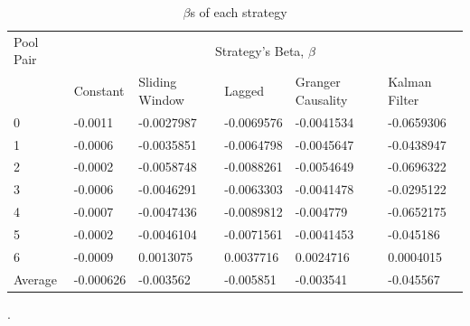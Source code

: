 \begin{table}[!htb]
    \centering
    \begin{adjustwidth}{-0.8in}{-0.9in}
        \begin{tabular}{|p{5em}|p{7em}|p{7em}|p{7em}|p{8em}|p{7em}|}\hline
            Pool Pair & \multicolumn{5}{|c|}{Strategy's Beta, $\beta$} \\\cline{1-6}
            & Constant & Sliding Window & Lagged & Granger Causality & Kalman Filter\\\cline{2-6}
            0 & -0.0011 & -0.0027987 & -0.0069576 & -0.0041534 & -0.0659306\\\cline{2-6}
            1 & -0.0006 & -0.0035851 & -0.0064798 & -0.0045647 & -0.0438947\\\cline{2-6}
            2 & -0.0002 & -0.0058748 & -0.0088261 & -0.0054649 & -0.0696322\\\cline{2-6}
            3 & -0.0006 & -0.0046291 & -0.0063303 & -0.0041478 & -0.0295122\\\cline{2-6}
            4 & -0.0007 & -0.0047436 & -0.0089812 & -0.004779 & -0.0652175\\\cline{2-6}
            5 & -0.0002 & -0.0046104 & -0.0071561 & -0.0041453 & -0.045186\\\cline{2-6}
            6 & -0.0009 & 0.0013075 & 0.0037716 & 0.0024716 & 0.0004015\\\hline\hline
            Average & -0.000626 & -0.003562 & -0.005851 & -0.003541 & -0.045567\\\hline
        \end{tabular}
    \end{adjustwidth}
    \caption{$\beta$s of each strategy \label{tab:betas}}.
\end{table}

